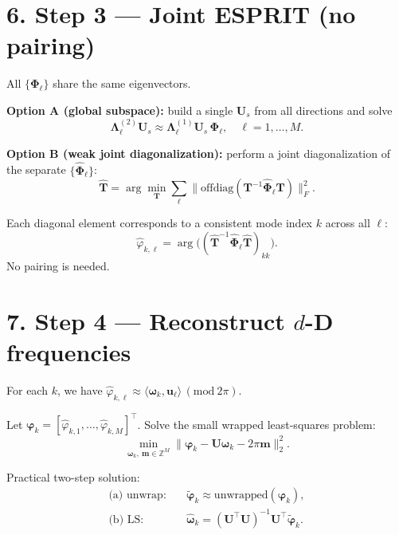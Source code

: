 \documentclass[11pt,a4paper]{article}
\begin{document}
\section*{6. Step 3 — Joint ESPRIT (no pairing)}

All $\{\mathbf{\Phi}_\ell\}$ share the same eigenvectors.

\textbf{Option A (global subspace):}
build a single $\mathbf{U}_s$ from all directions and solve
\[
\mathbf{\Lambda}_\ell^{(2)}\mathbf{U}_s 
\approx \mathbf{\Lambda}_\ell^{(1)}\mathbf{U}_s\,\mathbf{\Phi}_\ell,
\quad \ell=1,\dots,M.
\]

\textbf{Option B (weak joint diagonalization):}
perform a joint diagonalization of the separate $\{\widehat{\mathbf{\Phi}}_\ell\}$:
\begin{equation}
\widehat{\mathbf{T}} = 
\arg\min_{\mathbf{T}}\sum_\ell \|\mathrm{offdiag}(\mathbf{T}^{-1}\widehat{\mathbf{\Phi}}_\ell \mathbf{T})\|_F^2.
\end{equation}

Each diagonal element corresponds to a consistent mode index $k$ across all $\ell$:
\[
\widehat{\varphi}_{k,\ell} = 
\arg\!\big((\widehat{\mathbf{T}}^{-1}\widehat{\mathbf{\Phi}}_\ell \widehat{\mathbf{T}})_{kk}\big).
\]
No pairing is needed.

\section*{7. Step 4 — Reconstruct $d$-D frequencies}

For each $k$, we have
$\widehat{\varphi}_{k,\ell} \approx \langle \boldsymbol{\omega}_k, \mathbf{u}_\ell\rangle \, (\mathrm{mod}\ 2\pi)$.

Let 
$\boldsymbol{\varphi}_k = [\widehat{\varphi}_{k,1},\dots,\widehat{\varphi}_{k,M}]^\top$.
Solve the small wrapped least-squares problem:
\begin{equation}
\min_{\boldsymbol{\omega}_k,\ \mathbf{m}\in\mathbb{Z}^{M}} 
\|\boldsymbol{\varphi}_k - \mathbf{U}\boldsymbol{\omega}_k - 2\pi \mathbf{m}\|_2^2.
\end{equation}

Practical two-step solution:
\begin{align}
\text{(a) unwrap:}& \quad \widetilde{\boldsymbol{\varphi}}_k \approx \text{unwrapped}(\boldsymbol{\varphi}_k),\\[2pt]
\text{(b) LS:}& \quad 
\widehat{\boldsymbol{\omega}}_k = 
(\mathbf{U}^\top \mathbf{U})^{-1}\mathbf{U}^\top \widetilde{\boldsymbol{\varphi}}_k.
\end{align}
\end{document}
